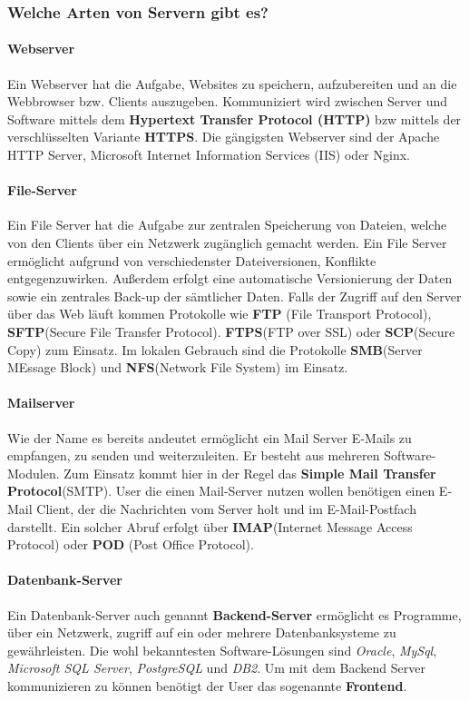 \subsubsection{Welche Arten von Servern gibt es?}
\paragraph*{Webserver}
Ein Webserver hat die Aufgabe, Websites zu speichern, aufzubereiten und an die Webbrowser bzw. Clients
auszugeben. Kommuniziert wird zwischen Server und Software mittels dem \textbf{Hypertext Transfer Protocol
    (HTTP)} bzw mittels der verschlüsselten Variante \textbf{HTTPS}. Die gängigsten Webserver sind
der Apache HTTP Server, Microsoft Internet Information Services (IIS) oder Nginx.

\paragraph{File-Server}
Ein File Server hat die Aufgabe zur zentralen Speicherung von Dateien, welche von den Clients
über ein Netzwerk zugänglich gemacht werden. Ein File Server ermöglicht aufgrund von verschiedenster
Dateiversionen, Konflikte entgegenzuwirken. Außerdem erfolgt eine automatische Versionierung der
Daten sowie ein zentrales Back-up der sämtlicher Daten. Falls der Zugriff auf den Server über das
Web läuft kommen Protokolle wie \textbf{FTP} (File Transport Protocol), \textbf{SFTP}(Secure File Transfer
Protocol). \textbf{FTPS}(FTP over SSL) oder \textbf{SCP}(Secure Copy) zum Einsatz. Im lokalen
Gebrauch sind die Protokolle \textbf{SMB}(Server MEssage Block) und \textbf{NFS}(Network File System)
im Einsatz.

\paragraph{Mailserver}
Wie der Name es bereits andeutet ermöglicht ein Mail Server E-Mails zu empfangen, zu senden und
weiterzuleiten. Er besteht aus mehreren Software-Modulen. Zum Einsatz kommt hier in der Regel
das \textbf{Simple Mail Transfer Protocol}(SMTP). User die einen Mail-Server nutzen
wollen benötigen einen E-Mail Client, der die Nachrichten vom Server holt und im E-Mail-Postfach
darstellt. Ein solcher Abruf erfolgt über \textbf{IMAP}(Internet Message Access Protocol) oder
\textbf{POD} (Post Office Protocol).

\paragraph{Datenbank-Server}
Ein Datenbank-Server auch genannt \textbf{Backend-Server} ermöglicht es Programme, über ein Netzwerk,
zugriff auf ein oder mehrere
Datenbanksysteme zu gewährleisten. Die wohl bekanntesten Software-Lösungen sind \textit{Oracle},
\textit{MySql}, \textit{Microsoft SQL Server}, \textit{PostgreSQL} und \textit{DB2}. Um mit dem
Backend Server kommunizieren zu können benötigt der User das sogenannte \textbf{Frontend}.
\underline{}

